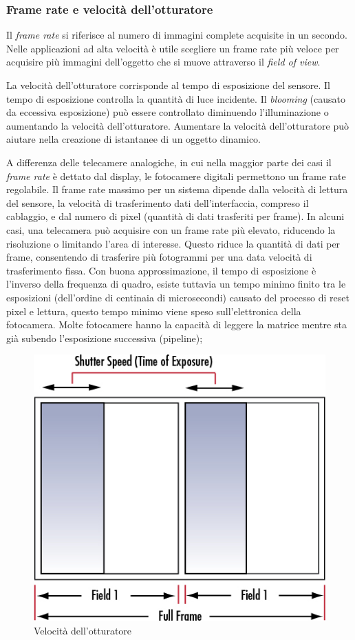 \subsubsection{Frame rate e velocità dell'otturatore}
Il \emph{frame rate} si riferisce al numero di immagini complete acquisite in un secondo.  Nelle applicazioni ad alta velocità è utile scegliere un frame rate più veloce per acquisire più immagini dell'oggetto che si muove attraverso il \emph{field of view}.

La velocità dell'otturatore corrisponde al tempo di esposizione del sensore. Il tempo di esposizione controlla la quantità di luce incidente. Il \emph{blooming} (causato da eccessiva esposizione) può essere controllato diminuendo l'illuminazione o aumentando la velocità dell'otturatore. Aumentare la velocità dell'otturatore può aiutare nella creazione di istantanee di un oggetto dinamico.

A differenza delle telecamere analogiche, in cui nella maggior parte dei casi il \emph{frame rate} è dettato dal display, le fotocamere digitali permettono un frame rate regolabile. Il frame rate massimo per un sistema dipende dalla velocità di lettura del sensore, la velocità di trasferimento dati dell'interfaccia, compreso il cablaggio, e dal numero di pixel (quantità di dati trasferiti per frame). In alcuni casi, una telecamera può acquisire con un frame rate più elevato, riducendo la risoluzione o limitando l'area di interesse. Questo riduce la quantità di dati per frame, consentendo di trasferire più fotogrammi per una data velocità di trasferimento fissa. Con buona approssimazione, il tempo di esposizione è l'inverso della frequenza di quadro, esiste tuttavia un tempo minimo finito tra le esposizioni (dell'ordine di centinaia di microsecondi) causato del processo di reset pixel e lettura, questo tempo minimo viene speso sull'elettronica della fotocamera. Molte fotocamere hanno la capacità di leggere la matrice mentre sta già subendo l'esposizione successiva (pipeline); 

\begin{figure}[!ht]
\centering
\includegraphics[width=.4\textwidth]{img/shutter-speed.jpeg}
\caption{Velocità dell'otturatore}
\label{fig:shutter-speed}
\end{figure}

